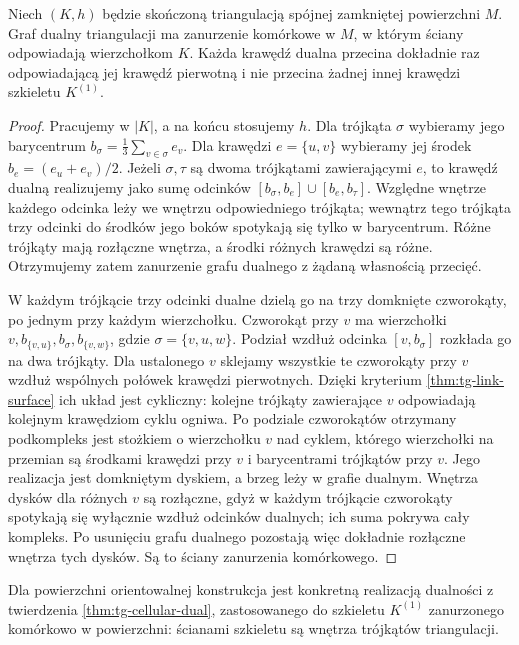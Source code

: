 \begin{stwierdzenie}
\label{prop:tg-triangulation-dual-embedding}
Niech $(K,h)$ będzie skończoną triangulacją spójnej
zamkniętej powierzchni $M$. Graf dualny triangulacji
ma zanurzenie komórkowe w $M$, w którym ściany
odpowiadają wierzchołkom $K$. Każda krawędź dualna
przecina dokładnie raz odpowiadającą jej krawędź
pierwotną i nie przecina żadnej innej krawędzi
szkieletu $K^{(1)}$.
\end{stwierdzenie}
\begin{proof}
Pracujemy w $|K|$, a na końcu stosujemy $h$.
Dla trójkąta $\sigma$ wybieramy jego barycentrum
$b_\sigma=\frac13\sum_{v\in\sigma}e_v$.
Dla krawędzi $e=\{u,v\}$ wybieramy jej środek
$b_e=(e_u+e_v)/2$. Jeżeli $\sigma,\tau$ są dwoma
trójkątami zawierającymi $e$, to krawędź dualną
realizujemy jako sumę odcinków
$[b_\sigma,b_e]\cup[b_e,b_\tau]$.
Względne wnętrze każdego odcinka leży we wnętrzu
odpowiedniego trójkąta; wewnątrz tego trójkąta
trzy odcinki do środków jego boków spotykają się
tylko w barycentrum. Różne trójkąty mają rozłączne
wnętrza, a środki różnych krawędzi są różne.
Otrzymujemy zatem zanurzenie grafu dualnego
z żądaną własnością przecięć.

W każdym trójkącie trzy odcinki dualne dzielą
go na trzy domknięte czworokąty, po jednym przy
każdym wierzchołku. Czworokąt przy $v$ ma wierzchołki
$v,b_{\{v,u\}},b_\sigma,b_{\{v,w\}}$, gdzie
$\sigma=\{v,u,w\}$. Podział wzdłuż odcinka
$[v,b_\sigma]$ rozkłada go na dwa trójkąty.
Dla ustalonego $v$ sklejamy wszystkie te czworokąty
przy $v$ wzdłuż wspólnych połówek krawędzi pierwotnych.
Dzięki kryterium \ref{thm:tg-link-surface} ich układ
jest cykliczny: kolejne trójkąty zawierające $v$
odpowiadają kolejnym krawędziom cyklu ogniwa.
Po podziale czworokątów otrzymany podkompleks
jest stożkiem o wierzchołku $v$ nad cyklem,
którego wierzchołki na przemian są środkami
krawędzi przy $v$ i barycentrami trójkątów przy $v$.
Jego realizacja jest domkniętym dyskiem,
a brzeg leży w grafie dualnym.
Wnętrza dysków dla różnych $v$ są rozłączne,
gdyż w każdym trójkącie czworokąty spotykają
się wyłącznie wzdłuż odcinków dualnych;
ich suma pokrywa cały kompleks.
Po usunięciu grafu dualnego pozostają więc
dokładnie rozłączne wnętrza tych dysków.
Są to ściany zanurzenia komórkowego.
\end{proof}

Dla powierzchni orientowalnej konstrukcja jest
konkretną realizacją dualności z twierdzenia
\ref{thm:tg-cellular-dual}, zastosowanego do
szkieletu $K^{(1)}$ zanurzonego komórkowo
w powierzchni: ścianami szkieletu są wnętrza
trójkątów triangulacji.

